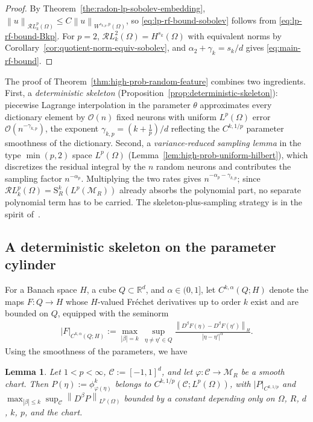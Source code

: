 \documentclass[12pt]{article}
\numberwithin{equation}{section}
\newtheorem{lemma}{Lemma}[section]
\numberwithin{figure}{section}
\numberwithin{equation}{section}
\newcommand{\R}{\mathbb{R}}
\newcommand{\Ccal}{\mathcal C}
\newcommand{\MR}{\mathcal M_R}
\newcommand{\norm}[1]{\left\|#1\right\|}
\newcommand{\abs}[1]{\left|#1\right|}
\begin{document}
\begin{proof}
By Theorem~\ref{the:radon-lp-sobolev-embedding},
$\norm{u}_{\mathcal{R}L^p_k(\Omega)}\le C\norm{u}_{W^{s_{k,p},p}(\Omega)}$, so
\eqref{eq:lp-rf-bound-sobolev} follows from \eqref{eq:lp-rf-bound-Bkp}. For
$p=2$, $\mathcal{R}L^2_k(\Omega)=H^{s_k}(\Omega)$ with equivalent norms by
Corollary~\ref{cor:quotient-norm-equiv-sobolev}, and
$\alpha_2+\gamma_k=s_k/d$ gives \eqref{eq:main-rf-bound}.
\end{proof}

The proof of Theorem~\ref{thm:high-prob-random-feature} combines two ingredients.
First, a \emph{deterministic skeleton}
(Proposition~\ref{prop:deterministic-skeleton}): piecewise Lagrange interpolation
in the parameter $\theta$ approximates every dictionary element by $\mathcal O(n)$ fixed
neurons with uniform $L^p(\Omega)$ error $\mathcal O(n^{-\gamma_{k,p}})$, the exponent
$\gamma_{k,p}=(k+\tfrac1p)/d$ reflecting the $C^{k,1/p}$ parameter smoothness of
the dictionary. Second, a \emph{variance-reduced sampling lemma} in the type
$\min(p,2)$ space $L^p(\Omega)$
(Lemma~\ref{lem:high-prob-uniform-hilbert}), which discretizes the residual
integral by the $n$ random neurons and contributes the sampling factor
$n^{-\alpha_p}$. Multiplying the two rates gives
$n^{-\alpha_p-\gamma_{k,p}}$; since
$\mathcal{R}L^p_k(\Omega)=\mathrm{S}^k_R(L^p(\MR))$ already absorbs the polynomial
part, no separate polynomial term has to be carried. The skeleton-plus-sampling
strategy is in the spirit of~\cite{siegel_sharpboundsapproximation_2024}.

\subsection{A deterministic skeleton on the parameter cylinder}

For a Banach space $H$, a cube $Q\subset\R^d$, and $\alpha\in(0,1]$, let
$C^{k,\alpha}(Q;H)$ denote the maps $F:Q\to H$ whose $H$-valued Fr\'echet
derivatives up to order $k$ exist and are bounded on $Q$, equipped with the
seminorm
\begin{align*}
    \abs{F}_{C^{k,\alpha}(Q;H)}
    :=\max_{\abs\beta=k}\,
    \sup_{\eta\ne\eta'\in Q}
    \frac{\norm{D^\beta F(\eta)-D^\beta F(\eta')}_H}{\abs{\eta-\eta'}^\alpha}.
\end{align*}
Using the smoothness of the parameters, we have
\begin{lemma}
\label{lem:local-parameter-smoothness}
Let $1<p<\infty$, $\Ccal:=[-1,1]^d$, and let $\varphi:\Ccal\to\MR$ be a smooth
chart. Then $P(\eta):=\phi^k_{\varphi(\eta)}$ belongs to
$C^{k,1/p}(\Ccal;L^p(\Omega))$, with $\abs{P}_{C^{k,1/p}}$ and
$\max_{\abs\beta\le k}\sup_\Ccal\norm{D^\beta P}_{L^p(\Omega)}$ bounded by a
constant depending only on $\Omega$, $R$, $d$, $k$, $p$, and the chart.
\end{lemma}
\end{document}
